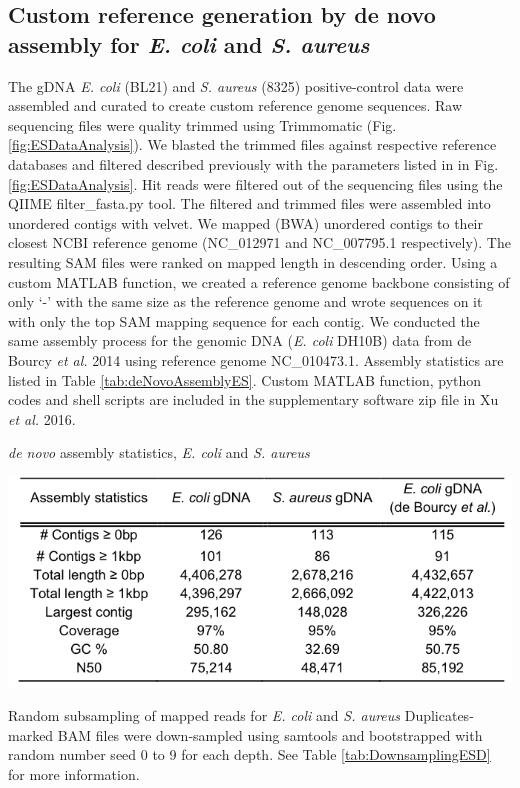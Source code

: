 \subsection{Custom reference generation by de novo assembly for \textit{E. coli} and \textit{S. aureus}}
The gDNA \textit{E. coli} (BL21) and \textit{S. aureus} (8325) positive-control data were assembled and curated to create custom reference genome sequences. Raw sequencing files were quality trimmed using Trimmomatic (Fig. \ref{fig:ESDataAnalysis}). We blasted the trimmed files against respective reference databases and filtered described previously with the parameters listed in in Fig. \ref{fig:ESDataAnalysis}. Hit reads were filtered out of the sequencing files using the QIIME filter\_fasta.py tool. The filtered and trimmed files were assembled into unordered contigs with velvet. We mapped (BWA) unordered contigs to their closest NCBI reference genome (NC\_012971 and NC\_007795.1 respectively). The resulting SAM files were ranked on mapped length in descending order. Using a custom MATLAB function, we created a reference genome backbone consisting of only `-' with the same size as the reference genome and wrote sequences on it with only the top SAM mapping sequence for each contig. We conducted the same assembly process for the genomic DNA (\textit{E. coli} DH10B) data from de Bourcy \textit{et al.} 2014 using reference genome NC\_010473.1. Assembly statistics are listed in Table \ref{tab:deNovoAssemblyES}. Custom MATLAB function, python codes and shell scripts are included in the supplementary software zip file in Xu \textit{et al.} 2016. 

\begin{table}
\caption{\textit{de novo} assembly statistics, \textit{E. coli} and \textit{S. aureus}}
\label{tab:deNovoAssemblyES}
\begin{center}
\includegraphics[width=0.7\linewidth]{./figures/deNovoAssemblyES}
\end{center}
\end{table}

Random subsampling of mapped reads for \textit{E. coli} and \textit{S. aureus}
Duplicates-marked BAM files were down-sampled using samtools and bootstrapped with random number seed 0 to 9 for each depth. See Table \ref{tab:DownsamplingESD} for more information. 

